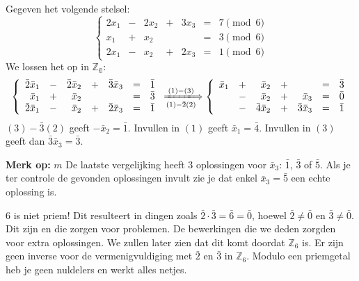 \textbf{} Gegeven het volgende stelsel:
\begin{equation*}
\left\{
\begin{array}{rcrcrcl}
    2x_1 & - & 2x_2 & + & 3x_3 & = & 7 \pmod{6} \\
     x_1 & + &  x_2 &   &      & = & 3 \pmod{6} \\
    2x_1 & - &  x_2 & + & 2x_3 & = & 1 \pmod{6}
\end{array}
\right.
\end{equation*}
We lossen het op in $\mathbb{Z_6}$:
\begin{equation*}
\left\{
\begin{array}{rcrcrcl}
    \bar{2}\bar{x}_1 & - & \bar{2}\bar{x}_2 & + & \bar{3}\bar{x}_3 & = & \bar{1} \\
     \bar{x}_1       & + & \bar{x}_2 &      &            & = & \bar{3} \\
    \bar{2}\bar{x}_1 & - & \bar{x}_2 & +    & \bar{2}\bar{x}_3 & = & \bar{1}
\end{array}
\right.
\xLongrightarrow[(1) - \bar{2}(2)]{(1) - (3)}
\left\{
\begin{array}{rcrcrcl}
    \bar{x}_1        & + & \bar{x}_2        & + &                  & = & \bar{3} \\
                     & - & \bar{x}_2        & + & \bar{x}_3        & = & \bar{0} \\
                     & - & \bar{4}\bar{x}_2 & + & \bar{3}\bar{x}_3 & = & \bar{1}
\end{array}
\right.
\end{equation*}
$(3) - \bar{3}(2)$ geeft $-\bar{x}_2 = \bar{1}$. Invullen in $(1)$ geeft $\bar{x}_1 = \bar{4}$. Invullen in $(3)$ geeft dan $\bar{3}\bar{x}_3 = \bar{3}$.
\begin{barbox}[red!66][red!1]
     \textbf{Merk op:} $m$ De laatste vergelijking heeft 3 oplossingen voor $\bar{x}_3$: $\bar{1}$, $\bar{3}$ of $\bar{5}$. Als je ter controle de gevonden oplossingen invult zie je dat enkel $\bar{x}_3 = \bar{5}$ een echte oplossing is.

    \vspace{0.25cm}

     6 is niet priem! Dit resulteert in dingen zoals $\bar{2} \cdot \bar{3} = \bar{6} = \bar{0}$, hoewel $\bar{2} \neq \bar{0}$ en $\bar{3} \neq \bar{0}$. Dit zijn \textbf{} en die zorgen voor problemen. De bewerkingen die we deden zorgden voor extra oplossingen. We zullen later zien dat dit komt doordat $\mathbb{Z}_6$ \textbf{} is. Er zijn geen inverse voor de vermenigvuldiging met $\bar{2}$ en $\bar{3}$ in $\mathbb{Z}_6$. Modulo een priemgetal heb je geen nuldelers en werkt alles netjes.
\end{barbox}

